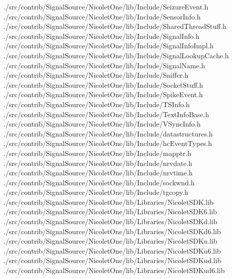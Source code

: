 \documentclass{wcletter}
\begin{document}
{	./src/contrib/SignalSource/NicoletOne/lib/Include/SeizureEvent.h \\ 
	./src/contrib/SignalSource/NicoletOne/lib/Include/SensorInfo.h \\ 
	./src/contrib/SignalSource/NicoletOne/lib/Include/SharedThreadStuff.h \\ 
	./src/contrib/SignalSource/NicoletOne/lib/Include/SignalInfo.h \\ 
	./src/contrib/SignalSource/NicoletOne/lib/Include/SignalInfoImpl.h \\ 
	./src/contrib/SignalSource/NicoletOne/lib/Include/SignalLookupCache.h \\ 
	./src/contrib/SignalSource/NicoletOne/lib/Include/SignalName.h \\ 
	./src/contrib/SignalSource/NicoletOne/lib/Include/Sniffer.h \\ 
	./src/contrib/SignalSource/NicoletOne/lib/Include/SocketStuff.h \\ 
	./src/contrib/SignalSource/NicoletOne/lib/Include/SpikeEvent.h \\ 
	./src/contrib/SignalSource/NicoletOne/lib/Include/TSInfo.h \\ 
	./src/contrib/SignalSource/NicoletOne/lib/Include/TextInfoBase.h \\ 
	./src/contrib/SignalSource/NicoletOne/lib/Include/VSyncInfo.h \\ 
	./src/contrib/SignalSource/NicoletOne/lib/Include/datastructures.h \\ 
	./src/contrib/SignalSource/NicoletOne/lib/Include/hcEventTypes.h \\ 
	./src/contrib/SignalSource/NicoletOne/lib/Include/mapptr.h \\ 
	./src/contrib/SignalSource/NicoletOne/lib/Include/nrvdate.h \\ 
	./src/contrib/SignalSource/NicoletOne/lib/Include/nrvtime.h \\ 
	./src/contrib/SignalSource/NicoletOne/lib/Include/sockwnd.h \\ 
	./src/contrib/SignalSource/NicoletOne/lib/Include/tgcopy.h \\ 
	./src/contrib/SignalSource/NicoletOne/lib/Libraries/NicoletSDK.lib \\ 
	./src/contrib/SignalSource/NicoletOne/lib/Libraries/NicoletSDK6.lib \\ 
	./src/contrib/SignalSource/NicoletOne/lib/Libraries/NicoletSDKd.lib \\ 
	./src/contrib/SignalSource/NicoletOne/lib/Libraries/NicoletSDKd6.lib \\ 
	./src/contrib/SignalSource/NicoletOne/lib/Libraries/NicoletSDKu.lib \\ 
	./src/contrib/SignalSource/NicoletOne/lib/Libraries/NicoletSDKu6.lib \\ 
	./src/contrib/SignalSource/NicoletOne/lib/Libraries/NicoletSDKud.lib \\ 
	./src/contrib/SignalSource/NicoletOne/lib/Libraries/NicoletSDKud6.lib
}
\end{document}
